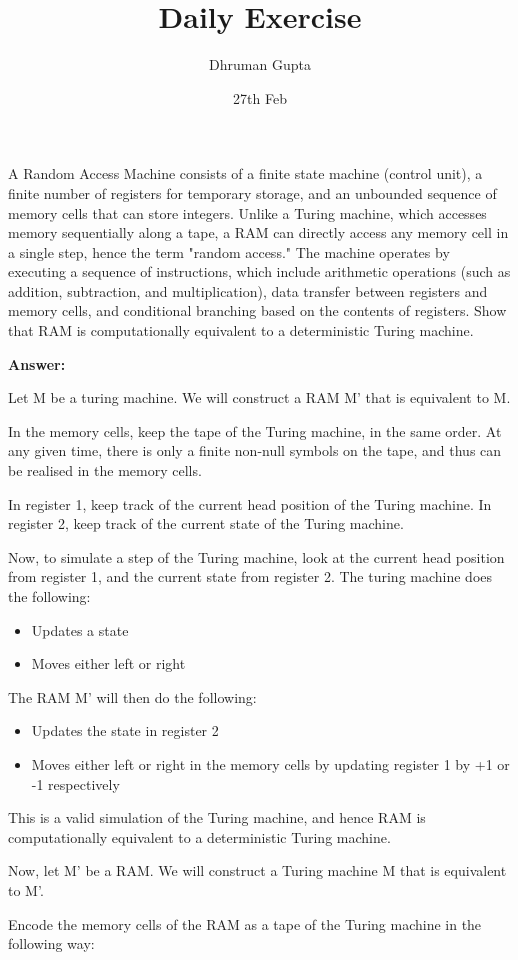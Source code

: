 \documentclass[11pt]{article}
\title{Daily Exercise}
\author{Dhruman Gupta}
\date{27th Feb}
\begin{document}

A Random Access Machine consists of a finite state machine (control unit), a finite number of registers for temporary storage, and an unbounded sequence of memory cells that can store integers. Unlike a Turing machine, which accesses memory sequentially along a tape, a RAM can directly access any memory cell in a single step, hence the term "random access." The machine operates by executing a sequence of instructions, which include arithmetic operations (such as addition, subtraction, and multiplication), data transfer between registers and memory cells, and conditional branching based on the contents of registers. Show that RAM is computationally equivalent to a deterministic Turing machine.

\textbf{Answer:}

Let M be a turing machine. We will construct a RAM M' that is equivalent to M.

In the memory cells, keep the tape of the Turing machine, in the same order. At any given time, there is only a finite non-null symbols on the tape, and thus can be realised in the memory cells.

In register 1, keep track of the current head position of the Turing machine. In register 2, keep track of the current state of the Turing machine.

Now, to simulate a step of the Turing machine, look at the current head position from register 1, and the current state from register 2. The turing machine does the following:
\begin{itemize}
    \item Updates a state
    \item Moves either left or right
\end{itemize}

The RAM M' will then do the following:
\begin{itemize}
    \item Updates the state in register 2
    \item Moves either left or right in the memory cells by updating register 1 by +1 or -1 respectively
\end{itemize}

This is a valid simulation of the Turing machine, and hence RAM is computationally equivalent to a deterministic Turing machine.

Now, let M' be a RAM. We will construct a Turing machine M that is equivalent to M'.

Encode the memory cells of the RAM as a tape of the Turing machine in the following way:
\end{document}

